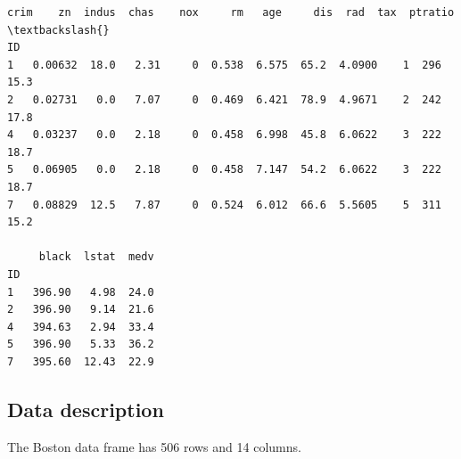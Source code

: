 \documentclass[11pt]{article}
\makeatletter
\newcommand{\boxspacing}{\kern\kvtcb@left@rule\kern\kvtcb@boxsep}
\newcommand{\prompt}[4]{
        {\ttfamily\llap{{\color{#2}[#3]:\hspace{3pt}#4}}\vspace{-\baselineskip}}
    }
\makeatother
\begin{document}
            \begin{tcolorbox}[breakable, size=fbox, boxrule=.5pt, pad at break*=1mm, opacityfill=0]
\prompt{Out}{outcolor}{3}{\boxspacing}
\begin{Verbatim}[commandchars=\\\{\}]
       crim    zn  indus  chas    nox     rm   age     dis  rad  tax  ptratio  \textbackslash{}
ID
1   0.00632  18.0   2.31     0  0.538  6.575  65.2  4.0900    1  296     15.3
2   0.02731   0.0   7.07     0  0.469  6.421  78.9  4.9671    2  242     17.8
4   0.03237   0.0   2.18     0  0.458  6.998  45.8  6.0622    3  222     18.7
5   0.06905   0.0   2.18     0  0.458  7.147  54.2  6.0622    3  222     18.7
7   0.08829  12.5   7.87     0  0.524  6.012  66.6  5.5605    5  311     15.2

     black  lstat  medv
ID
1   396.90   4.98  24.0
2   396.90   9.14  21.6
4   394.63   2.94  33.4
5   396.90   5.33  36.2
7   395.60  12.43  22.9
\end{Verbatim}
\end{tcolorbox}
        
    \subsection{Data description}\label{data-description}

The Boston data frame has 506 rows and 14 columns.
\end{document}
